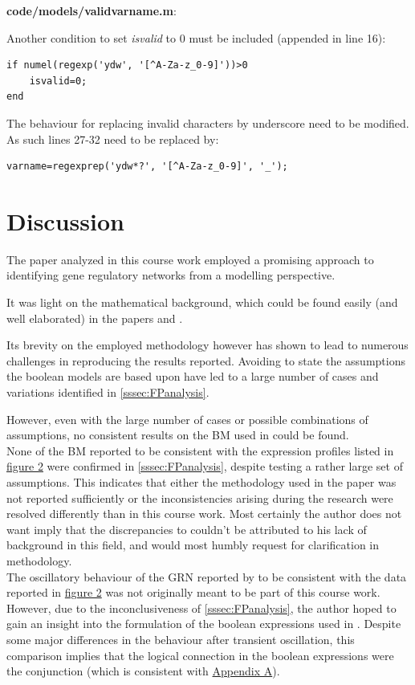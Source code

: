 \documentclass[11pt]{article}
\begin{document}
\textbf{code/models/validvarname.m}:

Another condition to set \textit{isvalid} to 0 must be included (appended in line 16):
\begin{lstlisting}
if numel(regexp('ydw', '[^A-Za-z_0-9]'))>0
    isvalid=0;
end
\end{lstlisting}

The behaviour for replacing invalid characters by underscore need to be modified. As such lines 27-32 need to be replaced by:
\begin{lstlisting}
varname=regexprep('ydw*?', '[^A-Za-z_0-9]', '_');
\end{lstlisting}

\section{Discussion} \label{sec:Discussion}
The paper analyzed in this course work employed a promising approach to identifying gene regulatory networks from a modelling perspective. 

It was light on the mathematical background, which could be found easily (and well elaborated) in the papers \cite{Krumsiek} and \cite{Wittmann}.

Its brevity on the employed methodology however has shown to lead to numerous challenges in reproducing the results reported. 
Avoiding to state the assumptions the boolean models are based upon have led to a large number of cases and variations identified in \ref{sssec:FPanalysis}.

However, even with the large number of cases or possible combinations of assumptions, no consistent results on the BM used in \cite{Kirkham} could be found. \\

None of the BM reported to be consistent with the expression profiles listed in \hyperref[table1]{figure 2} were confirmed in \ref{sssec:FPanalysis}, despite testing a rather large set of assumptions. This indicates that either the methodology used in the paper was not reported sufficiently or the inconsistencies arising during the research were resolved differently than in this course work.
Most certainly the author does not want imply that the discrepancies to \cite{Kirkham} couldn't be attributed to his lack of background in this field, and would most humbly request for clarification in methodology. \\

The oscillatory behaviour of the GRN reported by \cite{Kirkham} to be consistent with the data reported in \hyperref[table1]{figure 2} was not originally meant to be part of this course work. However, due to the inconclusiveness of \ref{sssec:FPanalysis}, the author hoped to gain an insight into the formulation of the boolean expressions used in \cite{Kirkham}.
Despite some major differences in the behaviour after transient oscillation, this comparison implies that the logical connection in the boolean expressions were the conjunction (which is consistent with \hyperref[ssec:Formaldescription]{Appendix A}). \\
\end{document}
